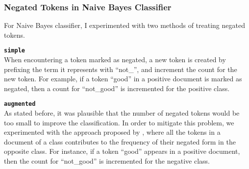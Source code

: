 \subsubsection{Negated Tokens in Naive Bayes Classifier}
For Naive Bayes classifier, I experimented with two methods of treating negated tokens.

{\bf \texttt{simple}}\\
When encountering a token marked as negated, a new token is created by prefixing the term it represents with ``not\_'', and increment the count for the new token. For example, if a token ``good'' in a positive document is marked as negated, then a count for ``not\_good'' is incremented for the positive class.

{\bf \texttt{augmented}}\\
As stated before, it was plausible that the number of negated tokens would be too small to improve the classification. In order to mitigate this problem, we experimented with the approach proposed by \cite{narayanan2013fast}, where all the tokens in a document of a class contributes to the frequency of their negated form in the opposite class. For instance, if a token ``good'' appears in a positive document, then the count for ``not\_good'' is incremented for the negative class.

